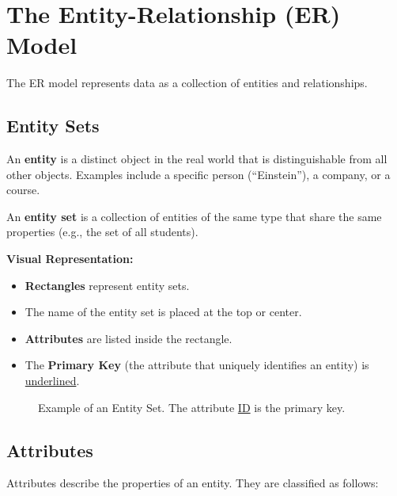 \documentclass[12pt,a4paper]{article}
\begin{document}
\newpage
\section{The Entity-Relationship (ER) Model}

The ER model represents data as a collection of entities and relationships.

\subsection{Entity Sets}
An \textbf{entity} is a distinct object in the real world that is distinguishable from all other objects. Examples include a specific person (``Einstein''), a company, or a course.

An \textbf{entity set} is a collection of entities of the same type that share the same properties (e.g., the set of all students).

\textbf{Visual Representation:}
\begin{itemize}
    \item \textbf{Rectangles} represent entity sets.
    \item The name of the entity set is placed at the top or center.
    \item \textbf{Attributes} are listed inside the rectangle.
    \item The \textbf{Primary Key} (the attribute that uniquely identifies an entity) is \underline{underlined}.
\end{itemize}

\begin{figure}[H]
    \centering
    \caption{Example of an Entity Set. The attribute \underline{ID} is the primary key.}
\end{figure}

\subsection{Attributes}
Attributes describe the properties of an entity. They are classified as follows:
\end{document}
